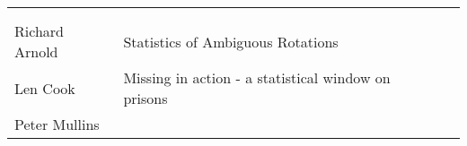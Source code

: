\documentclass[
]{book}
\begin{document}
\begin{longtable}[]{@{}llll@{}}
\begin{minipage}[t]{0.22\columnwidth}
\end{minipage} & \begin{minipage}[t]{0.22\columnwidth}\raggedright
\strut
\end{minipage} & \begin{minipage}[t]{0.22\columnwidth}\raggedright
\strut
\end{minipage}\tabularnewline
\begin{minipage}[t]{0.22\columnwidth}\raggedright
\strut
\end{minipage} & \begin{minipage}[t]{0.22\columnwidth}\raggedright
\strut
\end{minipage} & \begin{minipage}[t]{0.22\columnwidth}\raggedright
\strut
\end{minipage} & \begin{minipage}[t]{0.22\columnwidth}\raggedright
\strut
\end{minipage}\tabularnewline
\begin{minipage}[t]{0.22\columnwidth}\raggedright
Richard Arnold\strut
\end{minipage} & \begin{minipage}[t]{0.22\columnwidth}\raggedright
Statistics of Ambiguous Rotations\strut
\end{minipage} & \begin{minipage}[t]{0.22\columnwidth}\raggedright
\strut
\end{minipage} & \begin{minipage}[t]{0.22\columnwidth}\raggedright
\strut
\end{minipage}\tabularnewline
\begin{minipage}[t]{0.22\columnwidth}\raggedright
Len Cook\strut
\end{minipage} & \begin{minipage}[t]{0.22\columnwidth}\raggedright
Missing in action - a statistical window on prisons\strut
\end{minipage} & \begin{minipage}[t]{0.22\columnwidth}\raggedright
\strut
\end{minipage} & \begin{minipage}[t]{0.22\columnwidth}\raggedright
\strut
\end{minipage}\tabularnewline
\begin{minipage}[t]{0.22\columnwidth}\raggedright
Peter Mullins\strut
\end{minipage} & \begin{minipage}[t]{0.22\columnwidth}\raggedright

\end{minipage}
\end{longtable}
\end{document}
